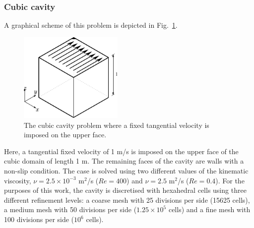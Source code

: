 \documentclass[final,3p,times,11pt,onecolumn]{myElsarticle}
\numberwithin{equation}{section}
\begin{document}
\subsubsection{Cubic cavity}
 A graphical scheme of this problem is depicted in Fig.~\ref{Fig:Cavity}.
\begin{figure}[b!!!]
\centering
\includegraphics[width=5cm]{fig/Cases/Cavity.pdf}
\caption{The cubic cavity problem where a fixed tangential velocity is imposed on the upper face.}
\label{Fig:Cavity}
\end{figure} 
Here, a tangential fixed velocity of 1 m/s is imposed on the upper face of the cubic domain of length 1 m. The remaining faces of the cavity are walls with a non-slip condition. The case is solved using two different values of the kinematic viscosity, $\nu = 2.5 \times 10^{-3}$ m$^2$/s ($Re=400$) and $\nu = 2.5$ m$^2$/s ($Re=0.4$). For the purposes of this work, the cavity is discretised with hexahedral cells using three different refinement levels: a coarse mesh with 25 divisions per side (15625 cells), a medium mesh with 50 divisions per side ($1.25 \times 10^{5}$ cells) and a fine mesh with 100 divisions per side ($10^{6}$ cells).
\end{document}

